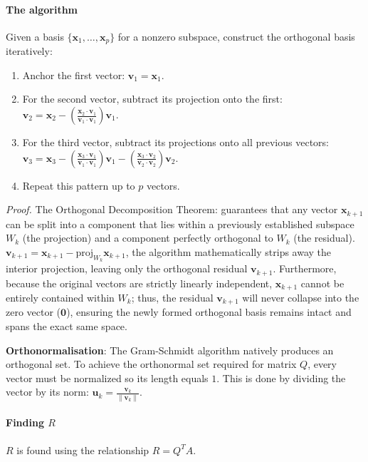 \documentclass[../linear-algebra.tex]{subfiles}
\begin{document}
\paragraph{The algorithm} Given a basis $\{\mathbf{x}_1, \dots, \mathbf{x}_p\}$ for a nonzero subspace, construct the orthogonal basis iteratively:
\begin{enumerate}
    \item Anchor the first vector: $\mathbf{v}_1 = \mathbf{x}_1$.
    \item For the second vector, subtract its projection onto the first: $\mathbf{v}_2 = \mathbf{x}_2 - \left(\frac{\mathbf{x}_2 \cdot \mathbf{v}_1}{\mathbf{v}_1 \cdot \mathbf{v}_1}\right)\mathbf{v}_1$.
    \item For the third vector, subtract its projections onto all previous vectors: $\mathbf{v}_3 = \mathbf{x}_3 - \left(\frac{\mathbf{x}_3 \cdot \mathbf{v}_1}{\mathbf{v}_1 \cdot \mathbf{v}_1}\right)\mathbf{v}_1 - \left(\frac{\mathbf{x}_3 \cdot \mathbf{v}_2}{\mathbf{v}_2 \cdot \mathbf{v}_2}\right)\mathbf{v}_2$.
    \item Repeat this pattern up to $p$ vectors.
\end{enumerate}
\textit{Proof.} The Orthogonal Decomposition Theorem: guarantees that any vector $\mathbf{x}_{k+1}$ can be split into a component that lies within a previously established subspace $W_k$ (the projection) and a component perfectly orthogonal to $W_k$ (the residual).
$\mathbf{v}_{k+1} = \mathbf{x}_{k+1} - \text{proj}_{W_k}\mathbf{x}_{k+1}$, the algorithm mathematically strips away the interior projection, leaving only the orthogonal residual $\mathbf{v}_{k+1}$.
Furthermore, because the original vectors are strictly linearly independent, $\mathbf{x}_{k+1}$ cannot be entirely contained within $W_k$; thus, the residual $\mathbf{v}_{k+1}$ will never collapse into the zero vector ($\mathbf{0}$), ensuring the newly formed orthogonal basis remains intact and spans the exact same space.

\medskip
\noindent \textbf{Orthonormalisation}: The Gram-Schmidt algorithm natively produces an orthogonal set. To achieve the orthonormal set required for matrix $Q$, every vector must be normalized so its length equals $1$. This is done by dividing the vector by its norm: $\mathbf{u}_k = \frac{\mathbf{v}_k}{\|\mathbf{v}_k\|}$.
\paragraph{Finding $R$} $R$ is found using the relationship $R = Q^T A$.
\end{document}
